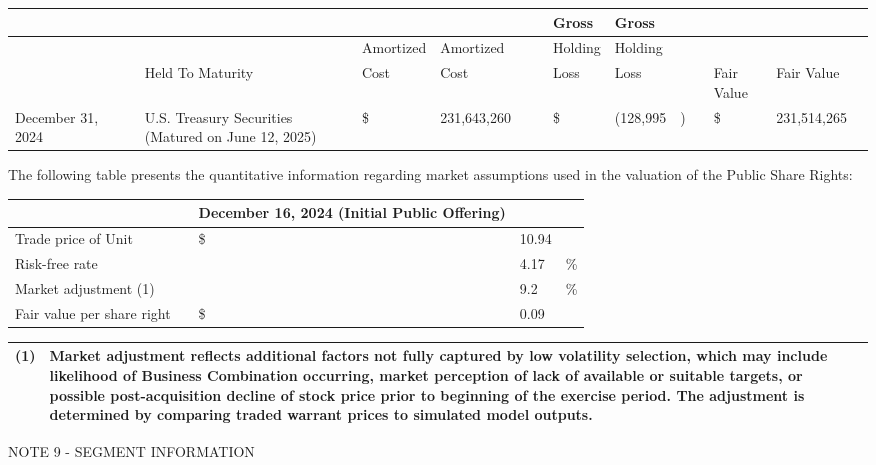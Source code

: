 \documentclass[11pt,a4paper]{article}
\begin{document}
\begin{table}[h]
\begin{tabular}{|l|l|l|l|l|l|l|l|l|l|l|l|l|l|l|l|}
\hline
 &  &  &  &  &  &  &  &  & Gross & Gross &  &  &  &  &  \\ \hline
 &  &  &  &  & Amortized & Amortized &  &  & Holding & Holding &  &  &  &  &  \\ \hline
 &  &  & Held To Maturity &  & Cost & Cost &  &  & Loss & Loss &  &  & Fair Value & Fair Value &  \\ \hline
December 31, 2024 &  &  & U.S. Treasury Securities (Matured on June 12, 2025) &  & \$ & 231,643,260 &  &  & \$ & (128,995 & ) &  & \$ & 231,514,265 &  \\ \hline
\end{tabular}
\end{table}

The following table presents the quantitative information regarding market assumptions used in the valuation of the Public Share Rights:

\begin{table}[h]
\begin{tabular}{|l|l|l|l|l|}
\hline
 &  & \textbf{December 16, 2024}  \textbf{(Initial Public Offering)} &  &  \\ \hline
Trade price of Unit &  & \$ & 10.94 &  \\ \hline
Risk-free rate &  &  & 4.17 & \% \\ \hline
Market adjustment (1) &  &  & 9.2 & \% \\ \hline
Fair value per share right &  & \$ & 0.09 &  \\ \hline
\end{tabular}
\end{table}

\begin{table}[h]
\begin{tabular}{|l|l|}
\hline
(1) & Market adjustment reflects additional factors not fully captured by low volatility selection, which may include likelihood of Business Combination occurring, market perception of lack of available or suitable targets, or possible post-acquisition decline of stock price prior to beginning of the exercise period. The adjustment is determined by comparing traded warrant prices to simulated model outputs. \\ \hline
\end{tabular}
\end{table}

NOTE 9 - SEGMENT INFORMATION
\end{document}
